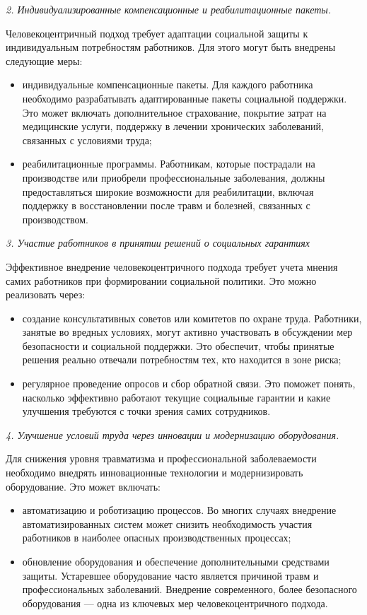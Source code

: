 \begin{multicols}{2}
\emph{2. Индивидуализированные компенсационные и реабилитационные
пакеты.}

Человекоцентричный подход требует адаптации социальной защиты к
индивидуальным потребностям работников. Для этого могут быть внедрены
следующие меры:

\begin{itemize}
\item
  индивидуальные компенсационные пакеты. Для каждого работника
  необходимо разрабатывать адаптированные пакеты социальной поддержки.
  Это может включать дополнительное страхование, покрытие затрат на
  медицинские услуги, поддержку в лечении хронических заболеваний,
  связанных с условиями труда;
\item
  реабилитационные программы. Работникам, которые пострадали на
  производстве или приобрели профессиональные заболевания, должны
  предоставляться широкие возможности для реабилитации, включая
  поддержку в восстановлении после травм и болезней, связанных с
  производством.
\end{itemize}

\emph{3. Участие работников в принятии решений о социальных гарантиях}

Эффективное внедрение человекоцентричного подхода требует учета мнения
самих работников при формировании социальной политики. Это можно
реализовать через:

\begin{itemize}
\item
  создание консультативных советов или комитетов по охране труда.
  Работники, занятые во вредных условиях, могут активно участвовать в
  обсуждении мер безопасности и социальной поддержки. Это обеспечит,
  чтобы принятые решения реально отвечали потребностям тех, кто
  находится в зоне риска;
\item
  регулярное проведение опросов и сбор обратной связи. Это поможет
  понять, насколько эффективно работают текущие социальные гарантии и
  какие улучшения требуются с точки зрения самих сотрудников.
\end{itemize}

\emph{4. Улучшение условий труда через инновации и модернизацию
оборудования.}

Для снижения уровня травматизма и профессиональной заболеваемости
необходимо внедрять инновационные технологии и модернизировать
оборудование. Это может включать:

\begin{itemize}
\item
  автоматизацию и роботизацию процессов. Во многих случаях внедрение
  автоматизированных систем может снизить необходимость участия
  работников в наиболее опасных производственных процессах;
\item
  обновление оборудования и обеспечение дополнительными средствами
  защиты. Устаревшее оборудование часто является причиной травм и
  профессиональных заболеваний. Внедрение современного, более
  безопасного оборудования --- одна из ключевых мер человекоцентричного
  подхода.
\end{itemize}


\end{multicols}
